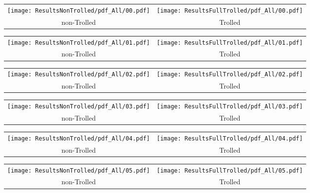\begin{tabular}{cc}
{  \texttt{[image: ResultsNonTrolled/pdf\_All/00.pdf]} } & 
{  \texttt{[image: ResultsFullTrolled/pdf\_All/00.pdf]}} \\
 non-Trolled & Trolled \\
\end{tabular}

\begin{tabular}{cc}
{  \texttt{[image: ResultsNonTrolled/pdf\_All/01.pdf]} } & 
{  \texttt{[image: ResultsFullTrolled/pdf\_All/01.pdf]}} \\
 non-Trolled & Trolled \\
\end{tabular}

\begin{tabular}{cc}
{  \texttt{[image: ResultsNonTrolled/pdf\_All/02.pdf]} } & 
{  \texttt{[image: ResultsFullTrolled/pdf\_All/02.pdf]}} \\
 non-Trolled & Trolled \\
\end{tabular}

\begin{tabular}{cc}
{  \texttt{[image: ResultsNonTrolled/pdf\_All/03.pdf]} } & 
{  \texttt{[image: ResultsFullTrolled/pdf\_All/03.pdf]}} \\
 non-Trolled & Trolled \\
\end{tabular}

\begin{tabular}{cc}
{  \texttt{[image: ResultsNonTrolled/pdf\_All/04.pdf]} } & 
{  \texttt{[image: ResultsFullTrolled/pdf\_All/04.pdf]}} \\
 non-Trolled & Trolled \\
\end{tabular}

\begin{tabular}{cc}
{  \texttt{[image: ResultsNonTrolled/pdf\_All/05.pdf]} } & 
{  \texttt{[image: ResultsFullTrolled/pdf\_All/05.pdf]}} \\
 non-Trolled & Trolled \\
\end{tabular}


